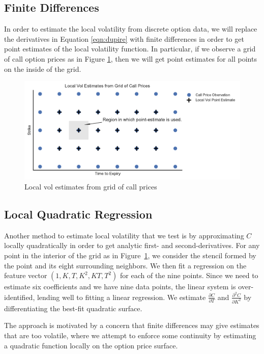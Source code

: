 \documentclass[11pt]{article}
\numberwithin{equation}{section}
\newcommand{\diff}[2]{\frac{\partial #1}{\partial #2}}
\begin{document}
\subsection{Finite Differences}

In order to estimate the local volatility from discrete option data, we will
replace the derivatives in Equation \ref{eqn:dupire} with finite differences in
order to get point estimates of the local volatility function. In particular, if
we observe a grid of call option prices as in Figure \ref{fig:localvolgrid},
then we will get point estimates for all points on the inside of the grid.

\begin{figure}[h]
\centering
\includegraphics{figs/localvolgrid}
\caption{Local vol estimates from grid of call prices}
\label{fig:localvolgrid}
\end{figure}


\subsection{Local Quadratic Regression}

Another method to estimate local volatility that we test is by approximating $C$ locally quadratically in order to get analytic first- and second-derivatives. For any point in the interior of the grid as in Figure~\ref{fig:localvolgrid}, we consider the stencil formed by the point and its eight surrounding neighbors. We then fit a regression on the feature vector $(1,K,T,K^2, KT,T^2)$ for each of the nine points. Since we need to estimate six coefficients and we have nine data points, the linear system is over-identified, lending well to fitting a linear regression. We estimate $\diff{C}{T}$ and $\diff{^2C}{K^2}$ by differentiating the best-fit quadratic surface.

The approach is motivated by a concern that finite differences may give estimates that are too volatile, where we attempt to enforce some continuity by estimating a quadratic function locally on the option price surface.
\end{document}
